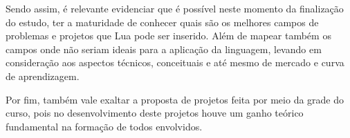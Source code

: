 \documentclass[
12pt, %
openright, %
oneside, %
a4paper, %
english, %
brazil, %
]{abntex2}
\begin{document}
Sendo assim, é relevante evidenciar que é possível neste momento da finalização do estudo, ter a maturidade de conhecer quais são os melhores campos de problemas e projetos que Lua pode ser inserido. Além de mapear também os campos onde não seriam ideais para a aplicação da linguagem, levando em consideração aos aspectos técnicos, conceituais e até mesmo de mercado e curva de aprendizagem.

Por fim, também vale exaltar a proposta de projetos feita por meio da grade do curso, pois no desenvolvimento deste projetos houve um ganho teórico fundamental na formação de todos envolvidos.

\postextual













\end{document}
